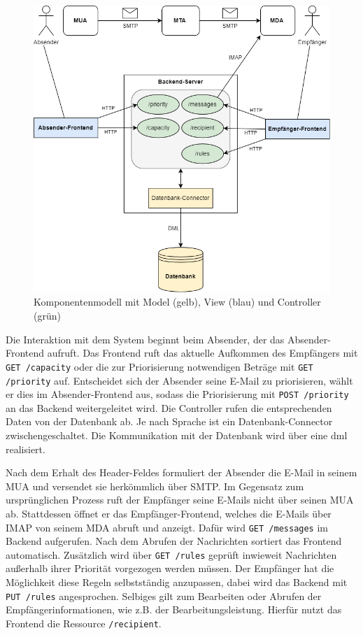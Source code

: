 \begin{figure}[!ht]
    \centering
 	\includegraphics[width=1\textwidth]{Figures/Komponentenmodell.png}
	\caption[Komponentenmodell mit Model, View und Controller]{Komponentenmodell mit Model (gelb), View (blau) und Controller (grün)}
	\label{fig:Komponentenmodell}
\end{figure}

\noindent Die Interaktion mit dem System beginnt beim Absender, der das Absender-Frontend aufruft. Das Frontend ruft das aktuelle Aufkommen des Empfängers mit \texttt{GET /capacity} oder die zur Priorisierung notwendigen Beträge mit \texttt{GET /priority} auf. Entscheidet sich der Absender seine E-Mail zu priorisieren, wählt er dies im Absender-Frontend aus, sodass die Priorisierung mit \texttt{POST /priority} an das Backend weitergeleitet wird. Die Controller rufen die entsprechenden Daten von der Datenbank ab. Je nach Sprache ist ein Datenbank-Connector zwischengeschaltet. Die Kommunikation mit der Datenbank wird über eine \acrfull{dml} realisiert.

Nach dem Erhalt des Header-Feldes formuliert der Absender die E-Mail in seinem MUA und versendet sie herkömmlich über SMTP. Im Gegensatz zum ursprünglichen Prozess ruft der Empfänger seine E-Mails nicht über seinen MUA ab. Stattdessen öffnet er das Empfänger-Frontend, welches die E-Mails über IMAP von seinem MDA abruft und anzeigt. Dafür wird \texttt{GET /messages} im Backend aufgerufen. Nach dem Abrufen der Nachrichten sortiert das Frontend automatisch. Zusätzlich wird über \texttt{GET /rules} geprüft inwieweit Nachrichten außerhalb ihrer Priorität vorgezogen werden müssen. Der Empfänger hat die Möglichkeit diese Regeln selbstständig anzupassen, dabei wird das Backend mit \texttt{PUT /rules} angesprochen. Selbiges gilt zum Bearbeiten oder Abrufen der Empfängerinformationen, wie z.B. der Bearbeitungsleistung. Hierfür nutzt das Frontend die Ressource \texttt{/recipient}.

